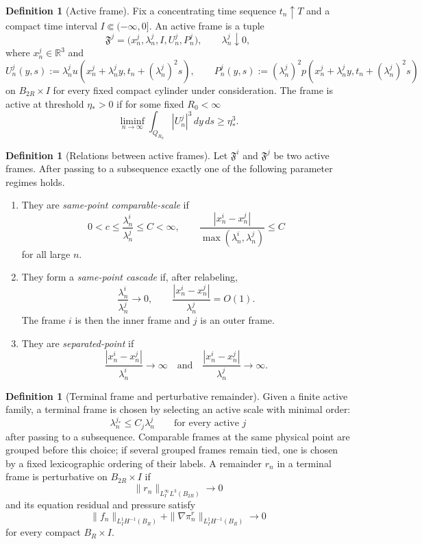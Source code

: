 \documentclass[11pt]{amsart}
\theoremstyle{plain}
\theoremstyle{definition}
\newtheorem{definition}[theorem]{Definition}
\theoremstyle{remark}
\begin{document}
\begin{definition}[Active frame]\label{def:active-frame}
Fix a concentrating time sequence \(t_n\uparrow T\) and a compact time interval
\(I\Subset(-\infty,0]\).  An active frame is a tuple
\[
  \mathfrak F^j=\bigl(x^j_n,\lambda^j_n,I,U^j_n,P^j_n\bigr),
  \qquad \lambda^j_n\downarrow0,
\]
where \(x^j_n\in\mathbb R^3\) and
\[
  U^j_n(y,s):=\lambda^j_n u(x^j_n+\lambda^j_n y,t_n+(\lambda^j_n)^2s),
  \qquad
  P^j_n(y,s):=(\lambda^j_n)^2p(x^j_n+\lambda^j_n y,t_n+(\lambda^j_n)^2s)
\]
on \(B_{2R}\times I\) for every fixed compact cylinder under consideration.
The frame is active at threshold \(\eta_*>0\) if for some fixed \(R_0<\infty\)
\[
  \liminf_{n\to\infty}\int_{Q_{R_0}}|U^j_n|^3\,dy\,ds\ge \eta_*^3.
\]
\end{definition}

\begin{definition}[Relations between active frames]\label{def:frame-relations}
Let \(\mathfrak F^i\) and \(\mathfrak F^j\) be two active frames.  After passing
to a subsequence exactly one of the following parameter regimes holds.
\begin{enumerate}[label=\textup{(\roman*)}]
\item They are \emph{same-point comparable-scale} if
\[
  0<c\le\frac{\lambda^i_n}{\lambda^j_n}\le C<\infty,\qquad
  \frac{|x^i_n-x^j_n|}{\max(\lambda^i_n,\lambda^j_n)}\le C
\]
for all large \(n\).
\item They form a \emph{same-point cascade} if, after relabeling,
\[
  \frac{\lambda^i_n}{\lambda^j_n}\to0,\qquad
  \frac{|x^i_n-x^j_n|}{\lambda^j_n}=O(1).
\]
The frame \(i\) is then the inner frame and \(j\) is an outer frame.
\item They are \emph{separated-point} if
\[
  \frac{|x^i_n-x^j_n|}{\lambda^i_n}\to\infty
  \quad\text{and}\quad
  \frac{|x^i_n-x^j_n|}{\lambda^j_n}\to\infty .
\]
\end{enumerate}
\end{definition}

\begin{definition}[Terminal frame and perturbative remainder]\label{def:terminal-frame}
Given a finite active family, a terminal frame is chosen by selecting an active
scale with minimal order:
\[
  \lambda^{j_*}_n\le C_j\lambda^j_n
  \qquad\text{for every active }j
\]
after passing to a subsequence.  Comparable frames at the same physical point
are grouped before this choice; if several grouped frames remain tied, one is
chosen by a fixed lexicographic ordering of their labels.  A remainder \(r_n\)
in a terminal frame is perturbative on \(B_{2R}\times I\) if
\[
  \|r_n\|_{L^\infty_I L^3(B_{2R})}\to0
\]
and its equation residual and pressure satisfy
\[
  \|f_n\|_{L^1_IH^{-1}(B_R)}+\|\nabla\pi^r_n\|_{L^1_IH^{-1}(B_R)}\to0
\]
for every compact \(B_R\times I\).
\end{definition}
\end{document}
